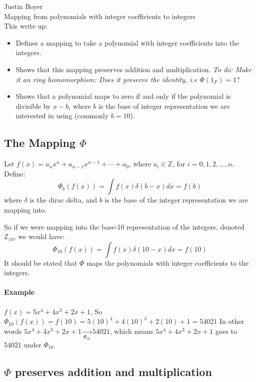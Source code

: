 \documentclass[12pt]{article}
\begin{document}



Justin Boyer\\
Mapping from polynomials with integer coefficients to integers\\

This write up:
\begin{itemize}
\item Defines a mapping to take a polynomial with integer coefficients into the integers.
\item Shows that this mapping preserves addition and multiplication.  \emph{To do: Make it an ring homomorphism: Does it preserve the identity, i.e $ \Phi(1_F) = 1$}?
\item Shows that a polynomial maps to zero if and only if the polynomial is divisible by $x-b$, where $b$ is the base of integer representation we are interested in using (commonly $b=10$).
\end{itemize}


\subsection*{The Mapping $\Phi$}
Let $f(x) = a_n x^n +a_{n-1} x^{n-1} + \cdots + a_0$, where $a_i \in \mathbb{Z}$, for $i=0, 1, 2, \ldots, n$.\\

Define:
$$
\Phi_b(f(x)) = \int f(x) \delta(b-x)dx = f(b)
$$
where $\delta$ is the dirac delta, and $b$ is the base of the integer representation we are mapping into.

So if we were mapping into the base-10 representation of the integers, denoted $\mathbb{Z}_{10}$, we would have:
$$
\Phi_{10}(f(x))  = \int f(x) \delta(10-x) dx = f(10)
$$
It should be stated that $\Phi$ maps the polynomials with integer coefficients to the integers.
\paragraph*{Example}
$f(x)= 5x^4+4x^3+2x+1$, So $\Phi_{10}(f(x))= f(10) = 5(10)^4 + 4(10)^3 + 2(10) + 1 = 54021$  In other words $5x^4+4x^3+2x+1 \xrightarrow[\Phi_{10}]{} 54021$, which means $5x^4+4x^3+2x+1$ goes to $54021$ under $\Phi_{10}$.

\subsection*{$\Phi$ preserves addition and multiplication}
\end{document}
